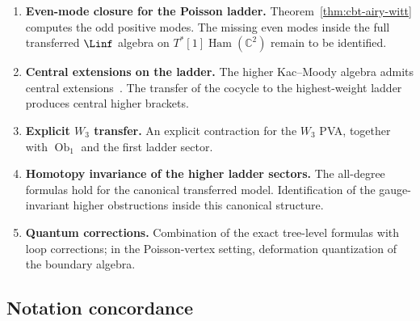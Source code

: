 \begin{enumerate}[leftmargin=2.2em]
\item \textbf{Even-mode closure for the Poisson ladder.}
Theorem~\ref{thm:cbt-airy-witt} computes the odd positive modes. The missing even modes inside the full transferred $\Linf$ algebra on $T^*[1]\operatorname{Ham}(\mathbb{C}^2)$ remain to be identified.

\item \textbf{Central extensions on the ladder.}
The higher Kac--Moody algebra admits central extensions~\cite{Zeng25}. The transfer of the cocycle to the highest-weight ladder produces central higher brackets.

\item \textbf{Explicit $W_3$ transfer.}
An explicit contraction for the $W_3$ PVA, together with $\operatorname{Ob}_1$ and the first ladder sector.

\item \textbf{Homotopy invariance of the higher ladder sectors.}
The all-degree formulas hold for the canonical transferred model. Identification of the gauge-invariant higher obstructions inside this canonical structure.

\item \textbf{Quantum corrections.}
Combination of the exact tree-level formulas with loop corrections; in the Poisson-vertex setting, deformation quantization of the boundary algebra.
\end{enumerate}

\subsection{Notation concordance}
\label{sec:cbt-notation-concordance}

